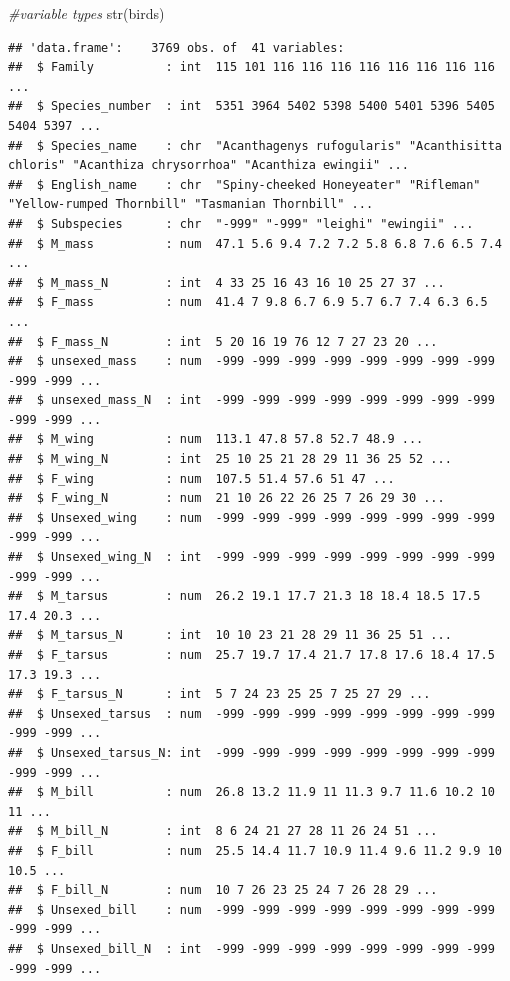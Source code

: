 \documentclass[
  12pt,
]{article}
\newenvironment{Shaded}{\begin{snugshade}}{\end{snugshade}}
\newcommand{\CommentTok}[1]{\textcolor[rgb]{0.56,0.35,0.01}{\textit{#1}}}
\newcommand{\FunctionTok}[1]{\textcolor[rgb]{0.00,0.00,0.00}{#1}}
\newcommand{\NormalTok}[1]{#1}
\begin{document}
\begin{Shaded}
\begin{Highlighting}[]
\CommentTok{\#variable types}
\FunctionTok{str}\NormalTok{(birds)}
\end{Highlighting}
\end{Shaded}

\begin{verbatim}
## 'data.frame':    3769 obs. of  41 variables:
##  $ Family          : int  115 101 116 116 116 116 116 116 116 116 ...
##  $ Species_number  : int  5351 3964 5402 5398 5400 5401 5396 5405 5404 5397 ...
##  $ Species_name    : chr  "Acanthagenys rufogularis" "Acanthisitta chloris" "Acanthiza chrysorrhoa" "Acanthiza ewingii" ...
##  $ English_name    : chr  "Spiny-cheeked Honeyeater" "Rifleman" "Yellow-rumped Thornbill" "Tasmanian Thornbill" ...
##  $ Subspecies      : chr  "-999" "-999" "leighi" "ewingii" ...
##  $ M_mass          : num  47.1 5.6 9.4 7.2 7.2 5.8 6.8 7.6 6.5 7.4 ...
##  $ M_mass_N        : int  4 33 25 16 43 16 10 25 27 37 ...
##  $ F_mass          : num  41.4 7 9.8 6.7 6.9 5.7 6.7 7.4 6.3 6.5 ...
##  $ F_mass_N        : int  5 20 16 19 76 12 7 27 23 20 ...
##  $ unsexed_mass    : num  -999 -999 -999 -999 -999 -999 -999 -999 -999 -999 ...
##  $ unsexed_mass_N  : int  -999 -999 -999 -999 -999 -999 -999 -999 -999 -999 ...
##  $ M_wing          : num  113.1 47.8 57.8 52.7 48.9 ...
##  $ M_wing_N        : int  25 10 25 21 28 29 11 36 25 52 ...
##  $ F_wing          : num  107.5 51.4 57.6 51 47 ...
##  $ F_wing_N        : num  21 10 26 22 26 25 7 26 29 30 ...
##  $ Unsexed_wing    : num  -999 -999 -999 -999 -999 -999 -999 -999 -999 -999 ...
##  $ Unsexed_wing_N  : int  -999 -999 -999 -999 -999 -999 -999 -999 -999 -999 ...
##  $ M_tarsus        : num  26.2 19.1 17.7 21.3 18 18.4 18.5 17.5 17.4 20.3 ...
##  $ M_tarsus_N      : int  10 10 23 21 28 29 11 36 25 51 ...
##  $ F_tarsus        : num  25.7 19.7 17.4 21.7 17.8 17.6 18.4 17.5 17.3 19.3 ...
##  $ F_tarsus_N      : int  5 7 24 23 25 25 7 25 27 29 ...
##  $ Unsexed_tarsus  : num  -999 -999 -999 -999 -999 -999 -999 -999 -999 -999 ...
##  $ Unsexed_tarsus_N: int  -999 -999 -999 -999 -999 -999 -999 -999 -999 -999 ...
##  $ M_bill          : num  26.8 13.2 11.9 11 11.3 9.7 11.6 10.2 10 11 ...
##  $ M_bill_N        : int  8 6 24 21 27 28 11 26 24 51 ...
##  $ F_bill          : num  25.5 14.4 11.7 10.9 11.4 9.6 11.2 9.9 10 10.5 ...
##  $ F_bill_N        : num  10 7 26 23 25 24 7 26 28 29 ...
##  $ Unsexed_bill    : num  -999 -999 -999 -999 -999 -999 -999 -999 -999 -999 ...
##  $ Unsexed_bill_N  : int  -999 -999 -999 -999 -999 -999 -999 -999 -999 -999 ...

\end{verbatim}
\end{document}
